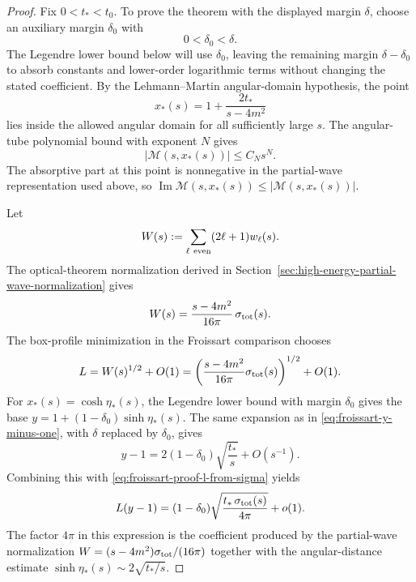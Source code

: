 \begin{proof}
Fix \(0<t_*<t_0\).  To prove the theorem with the displayed margin
\(\delta\), choose an auxiliary margin \(\delta_0\) with
\[
  0<\delta_0<\delta .
\]
The Legendre lower bound below will use \(\delta_0\), leaving the remaining
margin \(\delta-\delta_0\) to absorb constants and lower-order logarithmic
terms without changing the stated coefficient.  By the Lehmann--Martin
angular-domain hypothesis, the
point
\[
  x_*(s)=1+\frac{2t_*}{s-4m^2}
\]
lies inside the allowed angular domain for all sufficiently large \(s\).  The
angular-tube polynomial bound with exponent \(N\) gives
\begin{equation}
  |\mathcal M(s,x_*(s))|\le C_Ns^N .
  \label{eq:froissart-proof-polynomial-upper}
\end{equation}
The absorptive part at this point is nonnegative in the partial-wave
representation used above, so
\(\operatorname{Im}\mathcal M(s,x_*(s))\le|\mathcal M(s,x_*(s))|\).

Let
\[
  W(s):=\sum_{\ell\ {\rm even}}(2\ell+1)w_\ell(s).
\]
The optical-theorem normalization derived in
Section~\ref{sec:high-energy-partial-wave-normalization} gives
\[
  W(s)=\frac{s-4m^2}{16\pi}\,\sigma_{\rm tot}(s).
\]
The box-profile minimization in the Froissart comparison chooses
\begin{equation}
  L=W(s)^{1/2}+O(1)
  =
  \left(\frac{s-4m^2}{16\pi}\sigma_{\rm tot}(s)\right)^{1/2}
  +O(1).
  \label{eq:froissart-proof-l-from-sigma}
\end{equation}
For \(x_*(s)=\cosh\eta_*(s)\), the Legendre lower bound with margin
\(\delta_0\) gives the base \(y=1+(1-\delta_0)\sinh\eta_*(s)\).  The same
expansion as in \eqref{eq:froissart-y-minus-one}, with \(\delta\) replaced by
\(\delta_0\), gives
\begin{equation}
  y-1=2(1-\delta_0)\sqrt{\frac{t_*}{s}}+O(s^{-1}).
  \label{eq:froissart-proof-y-asymptotic}
\end{equation}
Combining this with \eqref{eq:froissart-proof-l-from-sigma} yields
\begin{equation}
  L(y-1)
  =
  (1-\delta_0)
  \sqrt{\frac{t_*\,\sigma_{\rm tot}(s)}{4\pi}}
  +o(1).
  \label{eq:froissart-proof-exponent}
\end{equation}
The factor \(4\pi\) in this expression is the coefficient produced by the
partial-wave normalization \(W=(s-4m^2)\sigma_{\rm tot}/(16\pi)\) together
with the angular-distance estimate
\(\sinh\eta_*(s)\sim2\sqrt{t_*/s}\).


\end{proof}
